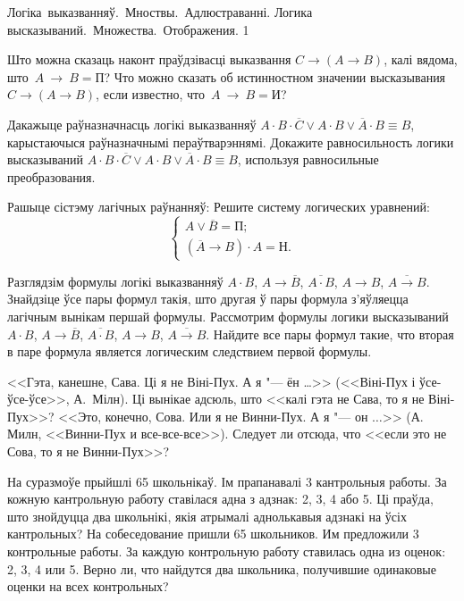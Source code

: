 \documentclass[12pt, a4paper]{article}
\begin{document}
\quizTitle
{Логіка~выказванняў.~Мноствы.~Адлюстраванні.}
{Логика высказываний.~Множества.~Отображения.}
{1}

\begin{problemList}

\problemItemSimple
{Што можна сказаць наконт праўдзівасці выказвання  $C \to (A \to B)$, калі вядома, што~$A~\to~B = \mbox{П}$?}
{Что можно сказать об истинностном значении высказывания $C \to (A \to B)$, если известно, что~$A~\to~B = \mbox{И}$?}

\bigskip

\problemItemSimple
{Дакажыце раўназначнасць логікі выказванняў $A \cdot B \cdot \overline{C} \vee A \cdot B \vee \overline{A} \cdot B \equiv B$,
карыстаючыся раўназначнымі пераўтварэннямі.}
{Докажите равносильность логики высказываний $A \cdot B \cdot \overline{C} \vee A \cdot B \vee \overline{A} \cdot B \equiv B$,
используя равносильные преобразования.}

\bigskip

\problemItemWithCommonPart
{Рашыце сістэму лагічных раўнанняў:}
{Решите систему логических уравнений:}
{\[\begin{cases} A \vee \overline{B} = \mbox{П}; \\ (\overline{A} \to B) \cdot A = \mbox{Н}. \end{cases}\]}

\smallskip

\problemItemSimple
{Разглядзім формулы логікі выказванняў $A \cdot B$, $A \to \overline{B}$, $\overline{A \cdot B}$, $A \to B$, $\overline{A \to B}$.
Знайдзіце ўсе пары формул такія, што другая ў пары формула з'яўляецца лагічным вынікам першай формулы.}
{Рассмотрим формулы логики высказываний $A \cdot B$, $A \to \overline{B}$, $\overline{A \cdot B}$, $A \to B$, $\overline{A \to B}$.
Найдите все пары формул такие, что вторая в паре формула является логическим следствием первой формулы.}

\bigskip

\problemItemSimple
{<<Гэта, канешне, Сава. Ці я не Віні-Пух. А я "--- ён \dots>> (<<Віні-Пух і ўсе-ўсе-ўсе>>, А.~Мілн).
Ці вынікае адсюль, што <<калі гэта не Сава, то я не Віні-Пух>>?}
{<<Это, конечно, Сова. Или я не Винни-Пух. А я "--- он $\ldots$>> (А. Милн, <<Винни-Пух и все-все-все>>).
Следует ли отсюда, что <<если это не Сова, то я не Винни-Пух>>?}

\bigskip

\problemItemSimple
{На суразмоўе прыйшлі 65 школьнікаў. Ім прапанавалі 3 кантрольныя работы. За кожную кантрольную работу ставілася адна з адзнак:
2, 3, 4 або 5. Ці праўда, што знойдуцца два школьнікі, якія атрымалі аднолькавыя адзнакі на ўсіх кантрольных?}
{На собеседование пришли 65 школьников. Им предложили 3 контрольные работы. За каждую контрольную работу ставилась одна из оценок:
2, 3, 4 или 5. Верно ли, что найдутся два школьника, получившие одинаковые оценки на всех контрольных?}


\end{problemList}
\end{document}

